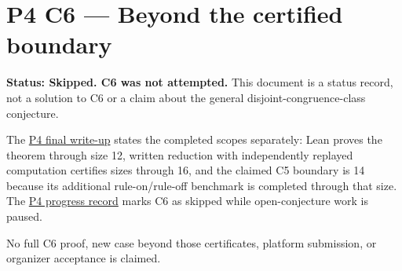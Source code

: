 \documentclass[11pt,a4paper]{article}
\begin{document}
\section{P4 C6 --- Beyond the certified boundary}\label{p4-c6-beyond-the-certified-boundary}

\textbf{Status: Skipped. C6 was not attempted.} This document is a status record, not a solution to C6 or a claim about the general disjoint-congruence-class conjecture.

The \href{https://github.com/mpelteshki/climbing-to-the-frontier/blob/212bba53b1818c08c40b8c4b48f636651eaf6410/cagent/p4/SUBMISSION.md}{P4 final write-up} states the completed scopes separately: Lean proves the theorem through size 12, written reduction with independently replayed computation certifies sizes through 16, and the claimed C5 boundary is 14 because its additional rule-on/rule-off benchmark is completed through that size. The \href{https://github.com/mpelteshki/climbing-to-the-frontier/blob/212bba53b1818c08c40b8c4b48f636651eaf6410/cagent/p4/README.md}{P4 progress record} marks C6 as skipped while open-conjecture work is paused.

No full C6 proof, new case beyond those certificates, platform submission, or organizer acceptance is claimed.
\end{document}
